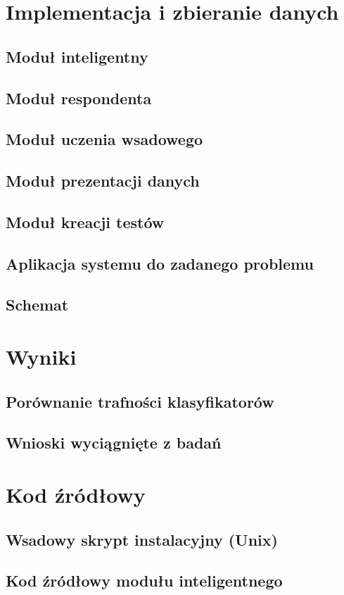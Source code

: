 \documentclass[12pt,a4paper,oneside]{report} %
\begin{document}
\section{Implementacja i zbieranie danych}
\subsection{Moduł inteligentny}
\subsection{Moduł respondenta}
\subsection{Moduł uczenia wsadowego}
\subsection{Moduł prezentacji danych}
\subsection{Moduł kreacji testów}
\subsection{Aplikacja systemu do zadanego problemu}
\subsection{Schemat}
\section{Wyniki}
\subsection{Porównanie trafności klasyfikatorów}
\subsection{Wnioski wyciągnięte z badań}
\section{Kod źródłowy}
\subsection{Wsadowy skrypt instalacyjny (Unix)}
\subsection{Kod źródłowy modułu inteligentnego}

\end{document}
